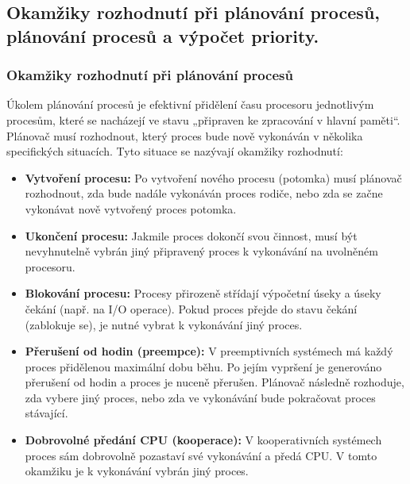 \subsection{Okamžiky rozhodnutí při plánování procesů, plánování procesů a výpočet priority.}
    \subsubsection{Okamžiky rozhodnutí při plánování procesů}
        Úkolem plánování procesů je efektivní přidělení času procesoru jednotlivým procesům, které se nacházejí ve stavu „připraven ke zpracování v hlavní paměti“. Plánovač musí rozhodnout, který proces bude nově vykonáván v několika specifických situacích. Tyto situace se nazývají okamžiky rozhodnutí:
        \begin{itemize}
            \item \textbf{Vytvoření procesu:} Po vytvoření nového procesu (potomka) musí plánovač rozhodnout, zda bude nadále vykonáván proces rodiče, nebo zda se začne vykonávat nově vytvořený proces potomka.
            \item \textbf{Ukončení procesu:} Jakmile proces dokončí svou činnost, musí být nevyhnutelně vybrán jiný připravený proces k vykonávání na uvolněném procesoru.
            \item \textbf{Blokování procesu:} Procesy přirozeně střídají výpočetní úseky a úseky čekání (např. na I/O operace). Pokud proces přejde do stavu čekání (zablokuje se), je nutné vybrat k vykonávání jiný proces.
            \item \textbf{Přerušení od hodin (preempce):} V preemptivních systémech má každý proces přidělenou maximální dobu běhu. Po jejím vypršení je generováno přerušení od hodin a proces je nuceně přerušen. Plánovač následně rozhoduje, zda vybere jiný proces, nebo zda ve vykonávání bude pokračovat proces stávající.
            \item \textbf{Dobrovolné předání CPU (kooperace):} V kooperativních systémech proces sám dobrovolně pozastaví své vykonávání a předá CPU. V tomto okamžiku je k vykonávání vybrán jiný proces.
        \end{itemize}
